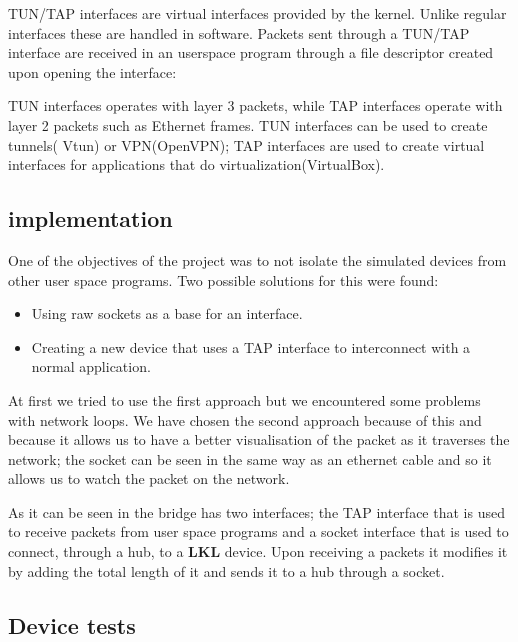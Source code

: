 TUN/TAP interfaces are virtual interfaces provided by the kernel. Unlike regular interfaces
these are handled in software. Packets sent through a TUN/TAP interface are received in
an userspace program through a file descriptor created upon opening the interface: 

\lstset{language=C,caption=Opening a tun/tap interface,label=lst:tapopen}


TUN interfaces operates with layer 3 packets, while TAP interfaces operate with layer 
2 packets such as Ethernet frames. TUN interfaces can be used to create tunnels( Vtun)
or VPN(OpenVPN); TAP interfaces are used to create virtual interfaces for applications 
that do virtualization(VirtualBox).

\subsection{\text{\project} implementation}
\label{sub-sec:bridge-lkl}

One of the objectives of the project was to not isolate the simulated devices from other user space 
programs. Two possible solutions for this were found:
\begin{itemize}
  \item Using raw sockets as a base for an interface.
  \item Creating a new device that uses a TAP interface to interconnect with a normal application.
\end{itemize}

At first we tried to use the first approach but we encountered some problems with network loops.
We have chosen the second approach because of this and because it allows us to have a better visualisation of the packet
as it traverses the network; the socket can be seen in the same way as an ethernet cable and so it allows
us to watch the packet on the network.


As it can be seen in  the bridge has two interfaces; the TAP interface that is used to 
receive packets from user space programs and a socket interface that is used to connect, through a hub, to 
a \textbf{LKL} device. Upon receiving a packets it modifies it by adding the total length of it and sends it to a hub 
through a socket.

\subsection{Device tests}
\label{sub-sec:bridge-tests}

